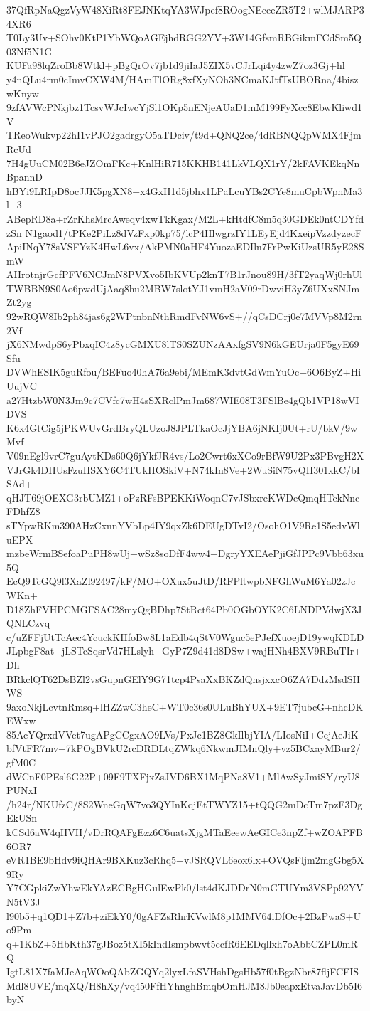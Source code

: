 37QfRpNaQgzVyW48XiRt8FEJNKtqYA3WJpef8ROogNEceeZR5T2+wlMJARP34XR6
T0Ly3Uv+SOhv0KtP1YbWQoAGEjhdRGG2YV+3W14GfsmRBGikmFCdSm5Q03Nf5N1G
KUFa98lqZroBb8Wtkl+pBgQrOv7jb1d9jiIaJ5ZIX5vCJrLqi4y4zwZ7oz3Gj+hl
y4nQLu4rm0cImvCXW4M/HAmTlORg8xfXyNOh3NCmaKJtfTsUBORna/4biszwKnyw
9zfAVWcPNkjbz1TcsvWJcIwcYjSl1OKp5nENjeAUaD1mM199FyXcc8EbwKliwd1V
TReoWukvp22hI1vPJO2gadrgyO5aTDciv/t9d+QNQ2ce/4dRBNQQpWMX4FjmRcUd
7H4gUuCM02B6eJZOmFKc+KnlHiR715KKHB141LkVLQX1rY/2kFAVKEkqNnBpannD
hBYi9LRIpD8ocJJK5pgXN8+x4GxH1d5jbhx1LPaLcuYBs2CYe8muCpbWpnMa3l+3
ABepRD8a+rZrKhsMrcAweqv4xwTkKgax/M2L+kHtdfC8m5q30GDEk0ntCDYfdzSn
N1gaod1/tPKe2PiLz8dVzFxp0kp75/lcP4HlwgrzIY1LEyEjd4KxeipVzzdyzecF
ApiINqY78sVSFYzK4HwL6vx/AkPMN0aHF4YuozaEDIln7FrPwKiUzsUR5yE28SmW
AIIrotnjrGcfPFV6NCJmN8PVXvo5IbKVUp2knT7B1rJnou89H/3fT2yaqWj0rhUl
TWBBN9S0Ao6pwdUjAaq8hu2MBW7slotYJ1vmH2aV09rDwviH3yZ6UXxSNJmZt2yg
92wRQW8Ib2ph84jas6g2WPtnbnNthRmdFvNW6vS+//qCsDCrj0e7MVVp8M2rn2Vf
jX6NMwdpS6yPbxqIC4z8ycGMXU8lTS0SZUNzAAxfgSV9N6kGEUrja0F5gyE69Sfu
DVWhESIK5guRfou/BEFuo40hA76a9ebi/MEmK3dvtGdWmYuOc+6O6ByZ+HiUujVC
a27HtzbW0N3Jm9c7CVfc7wH4sSXRclPmJm687WIE08T3FSlBe4gQb1VP18wVIDVS
K6x4GtCig5jPKWUvGrdBryQLUzoJ8JPLTkaOcJjYBA6jNKIj0Ut+rU/bkV/9wMvf
V09nEgl9vrC7guAytKDs60Q6jYkfJR4vs/Lo2Cwrt6xXCo9rBfW9U2Px3PBvgH2X
VJrGk4DHUsFzuHSXY6C4TUkHOSkiV+N74kIn8Ve+2WuSiN75vQH301xkC/bISAd+
qHJT69jOEXG3rbUMZ1+oPzRFsBPEKKiWoqnC7vJSbxreKWDeQmqHTckNncFDhfZ8
sTYpwRKm390AHzCxnnYVbLp4IY9qxZk6DEUgDTvI2/OsohO1V9Re1S5edvWluEPX
mzbeWrmBSefoaPuPH8wUj+wSz8soDfF4ww4+DgryYXEAePjiGfJPPc9Vbb63xu5Q
EcQ9TcGQ9l3XaZl92497/kF/MO+OXux5uJtD/RFPltwpbNFGhWuM6Ya02zJcWKn+
D18ZhFVHPCMGFSAC28myQgBDhp7StRct64Pb0OGbOYK2C6LNDPVdwjX3JQNLCzvq
c/uZFFjUtTcAec4YcuckKHfoBw8L1aEdb4qStV0Wguc5ePJefXuoejD19ywqKDLD
JLpbgF8at+jLSTcSqsrVd7HLslyh+GyP7Z9d41d8DSw+wajHNh4BXV9RBuTIr+Dh
BRkclQT62DsBZl2vsGupnGElY9G71tcp4PsaXxBKZdQnsjxxcO6ZA7DdzMsdSHWS
9axoNkjLcvtnRmsq+lHZZwC3heC+WT0c36s0ULuBhYUX+9ET7jubcG+nhcDKEWxw
85AcYQrxdVVet7ugAPgCCgxAO9LVs/PxJc1BZ8GkIlbjYIA/LIosNiI+CejAeJiK
bfVtFR7mv+7kPOgBVkU2rcDRDLtqZWkq6NkwmJIMnQly+vz5BCxayMBur2/gfM0C
dWCnF0PEsl6G22P+09F9TXFjxZsJVD6BX1MqPNa8V1+MlAwSyJmiSY/ryU8PUNxI
/h24r/NKUfzC/8S2WneGqW7vo3QYInKqjEtTWYZ15+tQQG2mDcTm7pzF3DgEkUSn
kCSd6aW4qHVH/vDrRQAFgEzz6C6uatsXjgMTaEeewAeGICe3npZf+wZOAPFB6OR7
eVR1BE9bHdv9iQHAr9BXKuz3cRhq5+vJSRQVL6eox6lx+OVQsFljm2mgGbg5X9Ry
Y7CGpkiZwYhwEkYAzECBgHGulEwPk0/lst4dKJDDrN0mGTUYm3VSPp92YVN5tV3J
l90b5+q1QD1+Z7b+ziEkY0/0gAFZsRhrKVwlM8p1MMV64iDfOc+2BzPwaS+Uo9Pm
q+1KbZ+5HbKth37gJBoz5tXI5kIndIsmpbwvt5ccfR6EEDqllxh7oAbbCZPL0mRQ
IgtL81X7faMJeAqWOoQAbZGQYq2lyxLfaSVHshDgsHb57f0tBgzNbr87fljFCFIS
Mdl8UVE/mqXQ/H8hXy/vq450FfHYhnghBmqbOmHJM8Jb0eapxEtvaJavDb5I6byN
